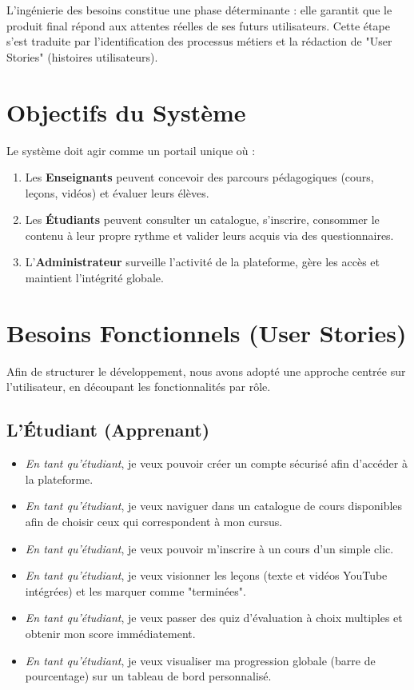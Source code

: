 \documentclass[12pt,a4paper]{report}
\begin{document}
L'ingénierie des besoins constitue une phase déterminante : elle garantit que le produit final répond aux attentes réelles de ses futurs utilisateurs. Cette étape s'est traduite par l'identification des processus métiers et la rédaction de "User Stories" (histoires utilisateurs).

\section{Objectifs du Système}
Le système doit agir comme un portail unique où :
\begin{enumerate}
    \item Les \textbf{Enseignants} peuvent concevoir des parcours pédagogiques (cours, leçons, vidéos) et évaluer leurs élèves.
    \item Les \textbf{Étudiants} peuvent consulter un catalogue, s'inscrire, consommer le contenu à leur propre rythme et valider leurs acquis via des questionnaires.
    \item L'\textbf{Administrateur} surveille l'activité de la plateforme, gère les accès et maintient l'intégrité globale.
\end{enumerate}

\section{Besoins Fonctionnels (User Stories)}

Afin de structurer le développement, nous avons adopté une approche centrée sur l'utilisateur, en découpant les fonctionnalités par rôle.

\subsection{L'Étudiant (Apprenant)}
\begin{itemize}[label=\faUserGraduate]
    \item \textit{En tant qu'étudiant}, je veux pouvoir créer un compte sécurisé afin d'accéder à la plateforme.
    \item \textit{En tant qu'étudiant}, je veux naviguer dans un catalogue de cours disponibles afin de choisir ceux qui correspondent à mon cursus.
    \item \textit{En tant qu'étudiant}, je veux pouvoir m'inscrire à un cours d'un simple clic.
    \item \textit{En tant qu'étudiant}, je veux visionner les leçons (texte et vidéos YouTube intégrées) et les marquer comme "terminées".
    \item \textit{En tant qu'étudiant}, je veux passer des quiz d'évaluation à choix multiples et obtenir mon score immédiatement.
    \item \textit{En tant qu'étudiant}, je veux visualiser ma progression globale (barre de pourcentage) sur un tableau de bord personnalisé.
\end{itemize}
\end{document}
